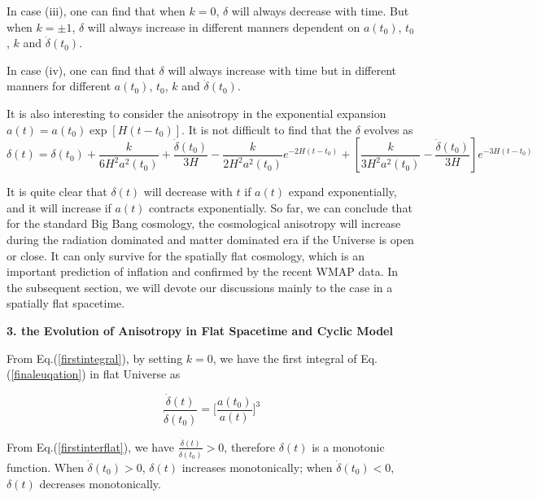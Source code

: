 \documentclass[a4paper,preprint]{revtex4}
\begin{document}
\noindent In case (iii), one can find that when $k=0$, $\delta$
will always decrease with time. But when $k=\pm1$, $\delta$ will
always increase in different manners dependent on $a(t_0)$, $t_0$,
$k$ and $\dot{\delta}(t_0)$.

\noindent In case (iv), one can find that $\delta$ will always
increase with time but in different manners for different
$a(t_0)$, $t_0$, $k$ and $\dot{\delta}(t_0)$.

It is also interesting to consider the anisotropy in the
exponential expansion $a(t)=a(t_0)\exp[H(t-t_0)]$. It is not
difficult to find that the $\delta$ evolves as
\begin{equation}\label{deltinexp}
\delta(t)=\delta(t_0)+\frac{k}{6H^2a^2(t_0)}+\frac{\dot{\delta}(t_0)}{3H}
-\frac{k}{2H^2a^2(t_0)}e^{-2H(t-t_0)}+\left[\frac{k}{3H^2a^2(t_0)}-
\frac{\dot{\delta}(t_0)}{3H}\right]e^{-3H(t-t_0)}
\end{equation}

It is quite clear that $\delta(t)$ will decrease with $t$ if
$a(t)$ expand exponentially, and it will increase if $a(t)$
contracts exponentially. So far, we can conclude that for the
standard Big Bang cosmology, the cosmological anisotropy will
increase during the radiation dominated and matter dominated era
if the Universe is open or close. It can only survive for the
spatially flat cosmology, which is an important prediction of
inflation and confirmed by the recent WMAP data. In the subsequent
section, we will devote our discussions mainly to the case in a
spatially flat spacetime.

\vspace{0.4cm} \noindent\textbf{3. the Evolution of Anisotropy in
Flat Spacetime and Cyclic Model }
 \vspace{0.4cm}

From Eq.(\ref{firstintegral}), by setting $k=0$, we have the first
integral of Eq.(\ref{finaleuqation}) in flat Universe as

\begin{equation}\label{firstinterflat}
\frac{\dot{\delta}(t)}{\dot{\delta}(t_0)}=
\bigg[\frac{a(t_0)}{a(t)}\bigg]^3
\end{equation}

\noindent From Eq.(\ref{firstinterflat}), we have
$\frac{\dot{\delta}(t)}{\dot{\delta}(t_0)}>0$, therefore
$\delta(t)$ is a monotonic function. When $\dot{\delta}(t_0)>0$,
$\delta(t)$ increases monotonically; when $\dot{\delta}(t_0)<0$,
$\delta(t)$ decreases monotonically.
\end{document}
